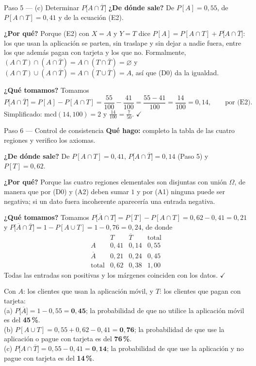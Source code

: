 \documentclass[11pt]{article}
\begin{document}
\begin{sol}
\begin{paso}{Paso 5 --- (c) Determinar $P\big[A\cap\overline{T}\big]$}
\textbf{¿De dónde sale?} De $P[A]=0{,}55$, de $P[A\cap T]=0{,}41$ y de la ecuación (E2).

\textbf{¿Por qué?} Porque (E2) con $X=A$ y $Y=T$ dice
$P[A]=P[A\cap T]+P\big[A\cap\overline{T}\big]$: los que usan la aplicación se parten, sin
traslape y sin dejar a nadie fuera, entre los que además pagan con tarjeta y los que no.
Formalmente, $(A\cap T)\cap(A\cap\overline{T})=A\cap(T\cap\overline{T})=\varnothing$ y
$(A\cap T)\cup(A\cap\overline{T})=A\cap(T\cup\overline{T})=A$, así que (D0) da la igualdad.

\textbf{¿Qué tomamos?} Tomamos
\[
P\big[A\cap\overline{T}\big]=P[A]-P[A\cap T]
=\frac{55}{100}-\frac{41}{100}=\frac{55-41}{100}=\frac{14}{100}=0{,}14 , \qquad\text{por (E2)} .
\]
Simplificado: $\mathrm{mcd}(14,100)=2$ y $\frac{14}{100}=\frac{7}{50}$. $\checkmark$
\end{paso}

\begin{paso}{Paso 6 --- Control de consistencia}
\textbf{Qué hago:} completo la tabla de las cuatro regiones y verifico los axiomas.

\textbf{¿De dónde sale?} De $P[A\cap T]=0{,}41$, $P\big[A\cap\overline{T}\big]=0{,}14$ (Paso 5)
y $P[T]=0{,}62$.

\textbf{¿Por qué?} Porque las cuatro regiones elementales son disjuntas con unión $\Omega$, de
manera que por (D0) y (A2) deben sumar $1$ y por (A1) ninguna puede ser negativa; si un dato
fuera incoherente aparecería una entrada negativa.

\textbf{¿Qué tomamos?} Tomamos
$P\big[\overline{A}\cap T\big]=P[T]-P[A\cap T]=0{,}62-0{,}41=0{,}21$ y
$P\big[\overline{A}\cap\overline{T}\big]=1-P[A\cup T]=1-0{,}76=0{,}24$, de donde
\[
\begin{array}{c|cc|c}
 & T & \overline{T} & \text{total}\\\hline
A & 0{,}41 & 0{,}14 & 0{,}55\\
\overline{A} & 0{,}21 & 0{,}24 & 0{,}45\\\hline
\text{total} & 0{,}62 & 0{,}38 & 1{,}00
\end{array}
\]
Todas las entradas son positivas y los márgenes coinciden con los datos. $\checkmark$
\end{paso}

\end{sol}

\begin{resp}
Con $A$: los clientes que usan la aplicación móvil, y $T$: los clientes que pagan con tarjeta:\\[4pt]
(a) $P\big[\overline{A}\big]=1-0{,}55=\mathbf{0{,}45}$; la probabilidad de que no utilice la
aplicación móvil es del \textbf{45\,\%}.\\[4pt]
(b) $P[A\cup T]=0{,}55+0{,}62-0{,}41=\mathbf{0{,}76}$; la probabilidad de que use la aplicación o
pague con tarjeta es del \textbf{76\,\%}.\\[4pt]
(c) $P\big[A\cap\overline{T}\big]=0{,}55-0{,}41=\mathbf{0{,}14}$; la probabilidad de que use la
aplicación y no pague con tarjeta es del \textbf{14\,\%}.
\end{resp}
\end{document}
